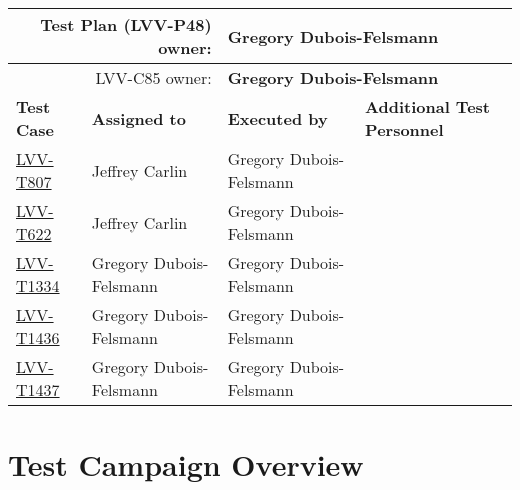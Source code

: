 \documentclass[DM,lsstdraft,STR,toc]{lsstdoc}
\begin{document}
\begin{longtable}{p{3cm}p{3cm}p{3cm}p{6cm}}
\hline
\multicolumn{2}{r}{Test Plan (LVV-P48) owner:} &
\multicolumn{2}{l}{\textbf{ Gregory Dubois-Felsmann } }\\\hline
\multicolumn{2}{r}{ LVV-C85 owner:} &
\multicolumn{2}{l}{\textbf{
    Gregory Dubois-Felsmann
}
} \\\hline
\textbf{Test Case} & \textbf{Assigned to} & \textbf{Executed by} & \textbf{Additional Test Personnel} \\ \hline
\href{https://jira.lsstcorp.org/secure/Tests.jspa#/testCase/LVV-T807}{LVV-T807}
& {\small Jeffrey Carlin } & {\small Gregory Dubois-Felsmann } &
\begin{minipage}[]{6cm}
\smallskip
{\small  }
\medskip
\end{minipage}
\\ \hline
\href{https://jira.lsstcorp.org/secure/Tests.jspa#/testCase/LVV-T622}{LVV-T622}
& {\small Jeffrey Carlin } & {\small Gregory Dubois-Felsmann } &
\begin{minipage}[]{6cm}
\smallskip
{\small  }
\medskip
\end{minipage}
\\ \hline
\href{https://jira.lsstcorp.org/secure/Tests.jspa#/testCase/LVV-T1334}{LVV-T1334}
& {\small Gregory Dubois-Felsmann } & {\small Gregory Dubois-Felsmann } &
\begin{minipage}[]{6cm}
\smallskip
{\small  }
\medskip
\end{minipage}
\\ \hline
\href{https://jira.lsstcorp.org/secure/Tests.jspa#/testCase/LVV-T1436}{LVV-T1436}
& {\small Gregory Dubois-Felsmann } & {\small Gregory Dubois-Felsmann } &
\begin{minipage}[]{6cm}
\smallskip
{\small  }
\medskip
\end{minipage}
\\ \hline
\href{https://jira.lsstcorp.org/secure/Tests.jspa#/testCase/LVV-T1437}{LVV-T1437}
& {\small Gregory Dubois-Felsmann } & {\small Gregory Dubois-Felsmann } &
\begin{minipage}[]{6cm}
\smallskip
{\small  }
\medskip
\end{minipage}
\\ \hline
\end{longtable}

\newpage

\section{Test Campaign Overview}
\label{sect:overview}
\end{document}
